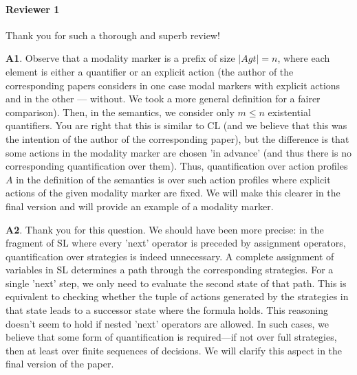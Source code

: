 \documentclass{article}
\begin{document}
\paragraph{Reviewer 1} Thank you for such a thorough and superb review!



\textbf{A1}. Observe that a modality marker is a prefix of size $|Agt| = n$, where each element is either a quantifier or an explicit action (the author of the corresponding papers considers in one case modal markers with explicit actions and in the other --- without. We took a more general definition for a fairer comparison). Then, in the semantics, we consider only $m \leqslant n$ existential quantifiers. You are right that this is similar to CL (and we believe that this was the intention of the author of the corresponding paper), but the difference is that some actions in the modality marker are chosen 'in advance' (and thus there is no corresponding quantification over them). Thus, quantification over action profiles $A$ in the definition of the semantics is over such action profiles where explicit actions of the given modality marker are fixed.  We will make this clearer in the final version and will provide an example of a modality marker.   


\textbf{A2}. Thank you for this question. We should have been more precise: in the fragment of SL where every 'next' operator is preceded by assignment operators, quantification over strategies is indeed unnecessary. A complete assignment of variables in SL determines a path through the corresponding strategies. For a single 'next' step, we only need to evaluate the second state of that path. This is equivalent to checking whether the tuple of actions generated by the strategies in that state leads to a successor state where the formula holds. This reasoning doesn't seem to hold if nested 'next' operators are allowed. In such cases, we believe that some form of quantification is required—if not over full strategies, then at least over finite sequences of decisions. 
We will clarify this aspect in the final version of the paper. 
\end{document}
